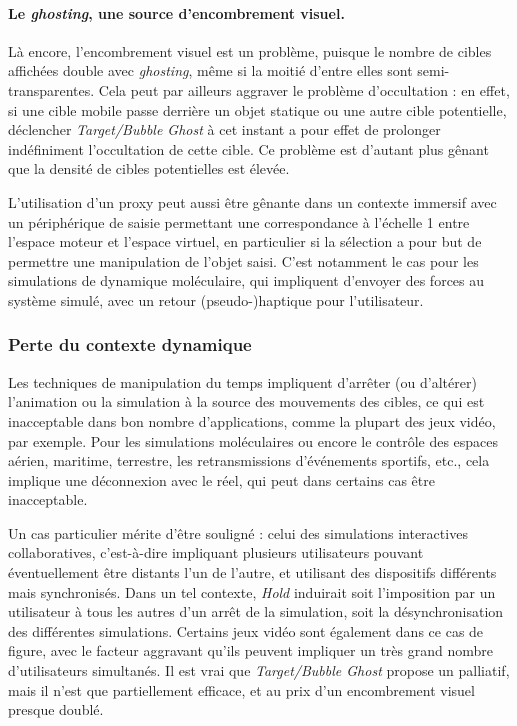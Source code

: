 	\paragraph{Le \emph{ghosting}, une source d'encombrement visuel.}
	Là encore, l'encombrement visuel est un problème, puisque le nombre de cibles affichées double avec \emph{ghosting}, même si la moitié d'entre elles sont semi-transparentes. Cela peut par ailleurs aggraver le problème d'occultation : en effet, si une cible mobile passe derrière un objet statique ou une autre cible potentielle, déclencher \emph{Target/Bubble Ghost} à cet instant a pour effet de prolonger indéfiniment l'occultation de cette cible. Ce problème est d'autant plus gênant que la densité de cibles potentielles est élevée.
		
	L'utilisation d'un proxy peut aussi être gênante dans un contexte immersif avec un périphérique de saisie permettant une correspondance à l'échelle 1 entre l'espace moteur et l'espace virtuel, en particulier si la sélection a pour but de permettre une manipulation de l'objet saisi. C'est notamment le cas pour les simulations de dynamique moléculaire, qui impliquent d'envoyer des forces au système simulé, avec un retour (pseudo-)haptique pour l'utilisateur.
		
	\subsubsection{Perte du contexte dynamique}
	Les techniques de manipulation du temps impliquent d'arrêter (ou d'altérer) l'animation ou la simulation à la source des mouvements des cibles, ce qui est inacceptable dans bon nombre d'applications, comme la plupart des jeux vidéo, par exemple. Pour les simulations moléculaires ou encore le contrôle des espaces aérien, maritime, terrestre, les retransmissions d'événements sportifs, etc., cela implique une déconnexion avec le réel, qui peut dans certains cas être inacceptable.
	
	Un cas particulier mérite d'être souligné : celui des simulations interactives collaboratives, c'est-à-dire impliquant plusieurs utilisateurs pouvant éventuellement être distants l'un de l'autre, et utilisant des dispositifs différents mais synchronisés. Dans un tel contexte, \emph{Hold} induirait soit l'imposition par un utilisateur à tous les autres d'un arrêt de la simulation, soit la désynchronisation des différentes simulations. Certains jeux vidéo sont également dans ce cas de figure, avec le facteur aggravant qu'ils peuvent impliquer un très grand nombre d'utilisateurs simultanés. Il est vrai que \emph{Target/Bubble Ghost} propose un palliatif, mais il n'est que partiellement efficace, et au prix d'un encombrement visuel presque doublé.
	
